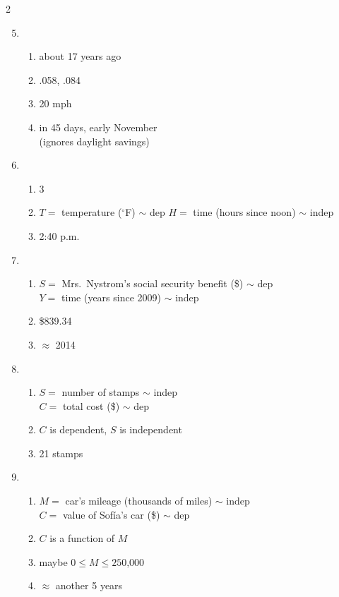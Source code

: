 \begin{multicols} {2}
\begin{enumerate}
\setcounter{enumi}{4}

\item %
\begin{enumerate}
\item about 17 years ago %
\item .058, .084 %
\item 20 mph %
\item in 45 days, early November \\ (ignores daylight savings) %
\end{enumerate}

\item %
\begin{enumerate}
\item 3
\item $T = $ temperature ($^\circ$F) $\sim$ dep $H = $ time (hours since noon) $\sim$ indep
\item 2:40 p.m.
\end{enumerate}

\item %
\begin{enumerate}
\item $S =$ Mrs.\ Nystrom's social security benefit (\$) $\sim$ dep \\ $Y=$ time (years since 2009) $\sim$ indep
\item \$839.34
\item $\approx$ 2014
\end{enumerate}


\item %
\begin{enumerate}
\item $S=$ number of stamps $\sim$ indep \\ $C=$ total cost (\$) $\sim$ dep
\item $C$ is dependent, $S$ is independent
\item 21 stamps 
\end{enumerate}

\item %
\begin{enumerate}
\item $M=$ car's mileage (thousands of miles) $\sim$ indep \\ $C=$ value of Sof\'ia's car (\$) $\sim$ dep
\item $C$ is a function of $M$
\item maybe $0 \le M \le \text{250,000}$
\item $\approx$ another 5 years
\end{enumerate}


\end{enumerate}
\end{multicols}
